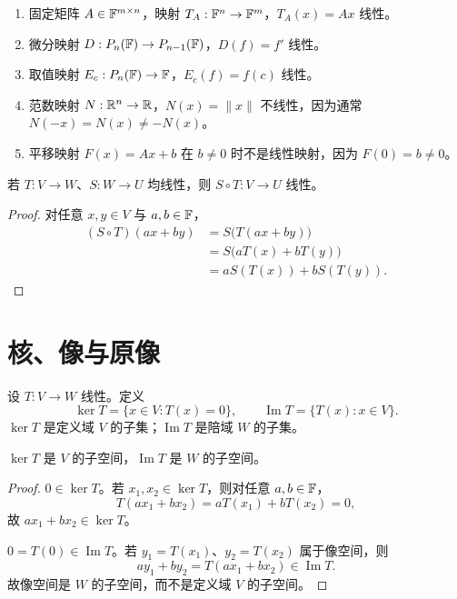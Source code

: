 \begin{example}[title={典型线性映射与非线性映射}]
\begin{enumerate}
\item 固定矩阵 $A\in\mathbb{F}^{m\times n}$，映射 $T_A:\mathbb{F}^n\to\mathbb{F}^m$，$T_A(x)=Ax$ 线性。
\item 微分映射 $D:P_n(\mathbb{F})\to P_{n-1}(\mathbb{F})$，$D(f)=f'$ 线性。
\item 取值映射 $E_c:P_n(\mathbb{F})\to\mathbb{F}$，$E_c(f)=f(c)$ 线性。
\item 范数映射 $N:\mathbb{R}^n\to\mathbb{R}$，$N(x)=\lVert x\rVert$ 不线性，因为通常 $N(-x)=N(x)\ne-N(x)$。
\item 平移映射 $F(x)=Ax+b$ 在 $b\ne0$ 时不是线性映射，因为 $F(0)=b\ne0$。
\end{enumerate}
\end{example}

\begin{proposition}[线性映射的复合]
若 $T:V\to W$、$S:W\to U$ 均线性，则 $S\circ T:V\to U$ 线性。
\end{proposition}
\begin{proof}
对任意 $x,y\in V$ 与 $a,b\in\mathbb{F}$，
\begin{align*}
(S\circ T)(ax+by)
&=S\bigl(T(ax+by)\bigr)\\
&=S\bigl(aT(x)+bT(y)\bigr)\\
&=aS(T(x))+bS(T(y)).
\end{align*}
\end{proof}

\section{核、像与原像}

\begin{definition}[核与像]
设 $T:V\to W$ 线性。定义
\[
\ker T=\{x\in V:T(x)=0\},
\qquad
\operatorname{Im}T=\{T(x):x\in V\}.
\]
$\ker T$ 是定义域 $V$ 的子集；$\operatorname{Im}T$ 是陪域 $W$ 的子集。
\end{definition}

\begin{proposition}[核与像是子空间]
$\ker T$ 是 $V$ 的子空间，$\operatorname{Im}T$ 是 $W$ 的子空间。
\end{proposition}
\begin{proof}
$0\in\ker T$。若 $x_1,x_2\in\ker T$，则对任意 $a,b\in\mathbb{F}$，
\[
T(ax_1+bx_2)=aT(x_1)+bT(x_2)=0,
\]
故 $ax_1+bx_2\in\ker T$。

$0=T(0)\in\operatorname{Im}T$。若 $y_1=T(x_1)$、$y_2=T(x_2)$ 属于像空间，则
\[
ay_1+by_2=T(ax_1+bx_2)\in\operatorname{Im}T.
\]
故像空间是 $W$ 的子空间，而不是定义域 $V$ 的子空间。
\end{proof}

